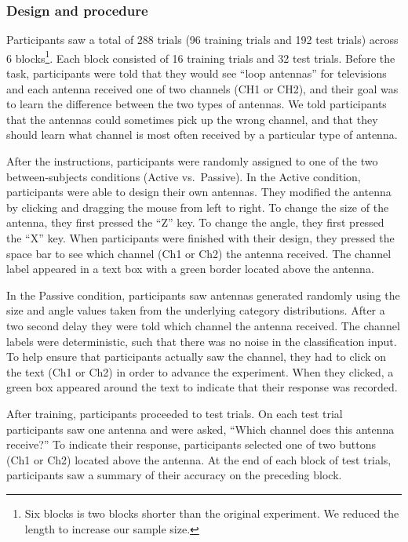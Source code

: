 \documentclass[10pt, letterpaper]{article}
\begin{document}
\subsubsection{Design and procedure}\label{design-and-procedure}

Participants saw a total of 288 trials (96 training trials and 192 test
trials) across 6
blocks\footnote{Six blocks is two blocks shorter than the original experiment. We reduced the length to increase our sample size.}.
Each block consisted of 16 training trials and 32 test trials. Before
the task, participants were told that they would see ``loop antennas''
for televisions and each antenna received one of two channels (CH1 or
CH2), and their goal was to learn the difference between the two types
of antennas. We told participants that the antennas could sometimes pick
up the wrong channel, and that they should learn what channel is most
often received by a particular type of antenna.

After the instructions, participants were randomly assigned to one of
the two between-subjects conditions (Active vs.~Passive). In the Active
condition, participants were able to design their own antennas. They
modified the antenna by clicking and dragging the mouse from left to
right. To change the size of the antenna, they first pressed the ``Z''
key. To change the angle, they first pressed the ``X'' key. When
participants were finished with their design, they pressed the space bar
to see which channel (Ch1 or Ch2) the antenna received. The channel
label appeared in a text box with a green border located above the
antenna.

In the Passive condition, participants saw antennas generated randomly
using the size and angle values taken from the underlying category
distributions. After a two second delay they were told which channel the
antenna received. The channel labels were deterministic, such that there
was no noise in the classification input. To help ensure that
participants actually saw the channel, they had to click on the text
(Ch1 or Ch2) in order to advance the experiment. When they clicked, a
green box appeared around the text to indicate that their response was
recorded.

After training, participants proceeded to test trials. On each test
trial participants saw one antenna and were asked, ``Which channel does
this antenna receive?'' To indicate their response, participants
selected one of two buttons (Ch1 or Ch2) located above the antenna. At
the end of each block of test trials, participants saw a summary of
their accuracy on the preceding block.
\end{document}
